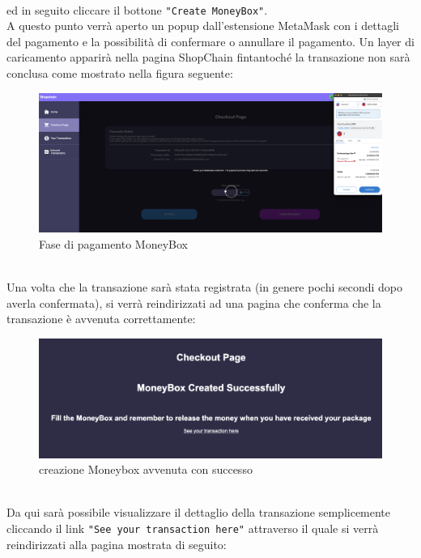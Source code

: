             \textbf{}\\
            ed in seguito cliccare il bottone \texttt{"Create MoneyBox"}.\\
            A questo punto verrà aperto un popup dall'estensione MetaMask con i dettagli del pagamento e la possibilità di confermare o annullare il pagamento. Un layer di caricamento apparirà nella pagina ShopChain fintantoché la transazione non sarà conclusa come mostrato nella figura seguente:
            \begin{figure}[H]
                \centering
                \includegraphics[scale=0.2]{immagini/Checkout/MoneyBoxLayer.png}
                \caption{Fase di pagamento MoneyBox}
            \end{figure}
            \textbf{}\\
            Una volta che la transazione sarà stata registrata (in genere pochi secondi dopo averla confermata), si verrà reindirizzati ad una pagina che conferma che la transazione è avvenuta correttamente:
            \begin{figure}[H]
                \centering
                \includegraphics[scale=0.3]{immagini/Checkout/MoneyBoxTransactionSuccess.png}
                \caption{creazione Moneybox avvenuta con successo}
            \end{figure}
            \textbf{}\\
            Da qui sarà possibile visualizzare il dettaglio della transazione semplicemente cliccando il link \texttt{"See your transaction here"} attraverso il quale si verrà reindirizzati alla pagina mostrata di seguito:
